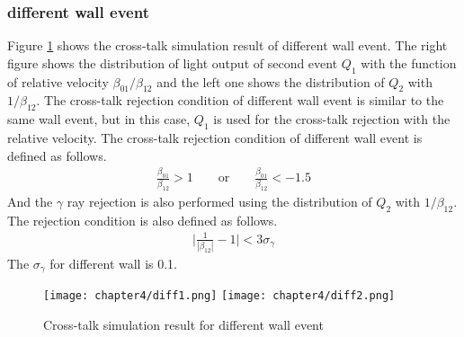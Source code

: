 \subsubsection{different wall event}
Figure \ref{fig:differentwall} shows the cross-talk simulation result of different wall event. The right figure shows the distribution of light output of second event $Q_1$ with the function of relative velocity $\beta_{01}/\beta_{12}$ and the left one shows the distribution of $Q_2$ with $1/\beta_{12}$. The cross-talk rejection condition of different wall event is similar to the same wall event, but in this case, $Q_1$ is used for the cross-talk rejection with the relative velocity. The cross-talk rejection condition of different wall event is defined as follows. 
\begin{align}
    \frac{\beta_{01}}{\beta_{12}} > 1 \qquad \text{or} \qquad  \frac{\beta_{01}}{\beta_{12}} < -1.5
\end{align}
And the $\gamma$ ray rejection is also performed using the distribution of $Q_2$ with $1/\beta_{12}$. The rejection condition is also defined as follows.
\begin{align}
    \bigg|\frac{1}{|\beta_{12}|} - 1\bigg| < 3\sigma_\gamma
\end{align}
The $\sigma_\gamma$ for different wall is 0.1.

\begin{figure}
    \centering
    \texttt{[image: chapter4/diff1.png]}\hspace{0.5cm}
    \texttt{[image: chapter4/diff2.png]}
    \caption{Cross-talk simulation result for different wall event}
    \label{fig:differentwall}
\end{figure}

